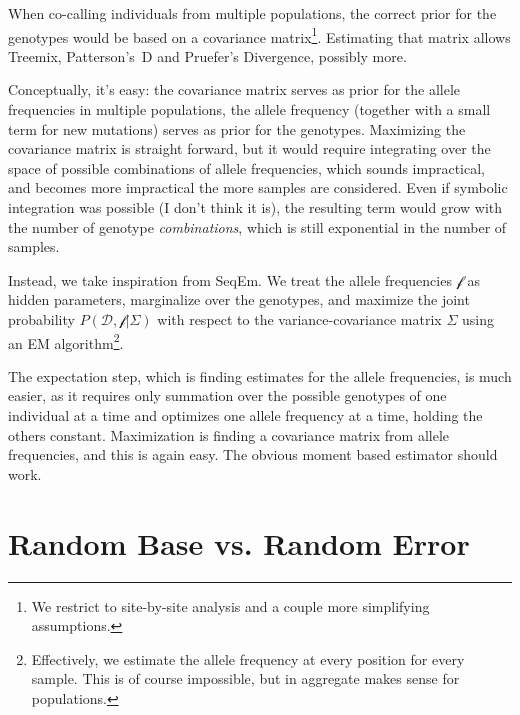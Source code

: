 \documentclass{article}
\begin{document}
When co-calling individuals from multiple populations, the correct prior
for the genotypes would be based on a covariance matrix\footnote{We
restrict to site-by-site analysis and a couple more simplifying
assumptions.}.  Estimating
that matrix allows Treemix, Patterson's~D and Pruefer's Divergence,
possibly more.  %

Conceptually, it's easy:  the covariance matrix serves as prior for the
allele frequencies in multiple populations, the allele frequency
(together with a small term for new mutations) serves as prior for the
genotypes.  Maximizing the covariance matrix is
straight forward, but it would require integrating over the space of
possible combinations of allele frequencies, which sounds impractical,
and becomes more impractical the more samples are considered.  Even if
symbolic integration was possible (I don't think it is), the resulting
term would grow with the number of genotype \emph{combinations}, which
is still exponential in the number of samples.

Instead, we take inspiration from SeqEm\cite{seqem}.  We treat the
allele frequencies $\mathcal{f}$ as hidden parameters, marginalize over
the genotypes, and maximize the joint probability $P(\mathcal{D},
\mathcal{f} | \Sigma)$ with respect to the variance-covariance matrix
$\Sigma$ using an EM algorithm\footnote{Effectively, we estimate the
allele frequency at every position for every sample.  This is of course
impossible, but in aggregate makes sense for populations.}.

The expectation step, which is finding estimates for the allele
frequencies, is much easier, as it requires only summation over the
possible genotypes of one individual at a time and optimizes one allele
frequency at a time, holding the others constant.  Maximization is
finding a covariance matrix from allele frequencies, and this is again
easy.  The obvious moment based estimator should work.



\appendix

\section{Random Base vs. Random Error}
\label{app_errprob}
\end{document}
